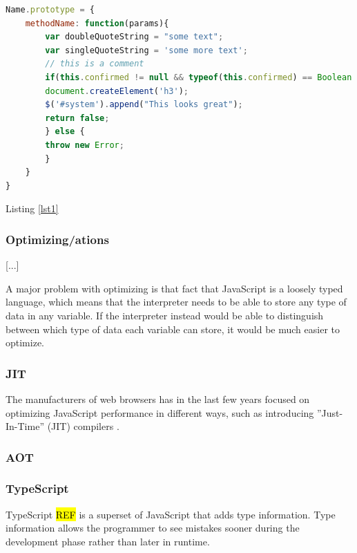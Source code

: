 \clearpage

\begin{lstlisting}[label=lst1,language=JavaScript,numbers=none,caption=prototype.js,frame=none]
Name.prototype = {
    methodName: function(params){
        var doubleQuoteString = "some text";
        var singleQuoteString = 'some more text';
        // this is a comment
        if(this.confirmed != null && typeof(this.confirmed) == Boolean && this.confirmed == true){
        document.createElement('h3');
        $('#system').append("This looks great");
        return false;
        } else {
        throw new Error;
        }
    }
}
\end{lstlisting}

\blindtext Listing \ref{lst1}

\subsubsection*{Optimizing/ations}

[...]

A major problem with optimizing is that fact that JavaScript is a loosely typed language, which means that the interpreter needs to be able to store any type of data in any variable. If the interpreter instead would be able to distinguish between which type of data each variable can store, it would be much easier to optimize.

\subsubsection*{JIT}

The manufacturers of web browsers has in the last few years focused on optimizing JavaScript performance in different ways, such as introducing ''Just-In-Time'' (JIT) compilers \parencite{HerreraChenLavoieHendren2018}.

\subsubsection*{AOT}



\subsubsection*{TypeScript}

TypeScript \hl{REF} is a superset of JavaScript that adds type information. Type information allows the programmer to see mistakes sooner during the development phase rather than later in runtime.

